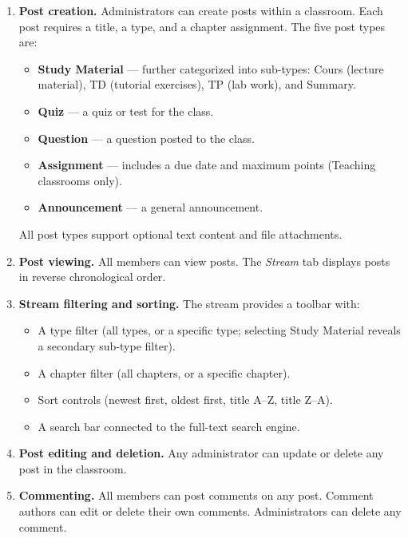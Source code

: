 \begin{enumerate}[label=\textbf{FR-\arabic*.}, leftmargin=2.5cm, resume]
  \item \textbf{Post creation.}
        Administrators can create posts within a classroom.
        Each post requires a title, a type, and a chapter assignment.
        The five post types are:
        \begin{itemize}[nosep]
          \item \textbf{Study Material} --- further categorized into sub-types: Cours (lecture material), TD (tutorial exercises), TP (lab work), and Summary.
          \item \textbf{Quiz} --- a quiz or test for the class.
          \item \textbf{Question} --- a question posted to the class.
          \item \textbf{Assignment} --- includes a due date and maximum points (Teaching classrooms only).
          \item \textbf{Announcement} --- a general announcement.
        \end{itemize}
        All post types support optional text content and file attachments.

  \item \textbf{Post viewing.}
        All members can view posts.
        The \emph{Stream} tab displays posts in reverse chronological order.

  \item \textbf{Stream filtering and sorting.}
        The stream provides a toolbar with:
        \begin{itemize}[nosep]
          \item A type filter (all types, or a specific type; selecting Study Material reveals a secondary sub-type filter).
          \item A chapter filter (all chapters, or a specific chapter).
          \item Sort controls (newest first, oldest first, title A--Z, title Z--A).
          \item A search bar connected to the full-text search engine.
        \end{itemize}

  \item \textbf{Post editing and deletion.}
        Any administrator can update or delete any post in the classroom.

  \item \textbf{Commenting.}
        All members can post comments on any post.
        Comment authors can edit or delete their own comments.
        Administrators can delete any comment.
\end{enumerate}

